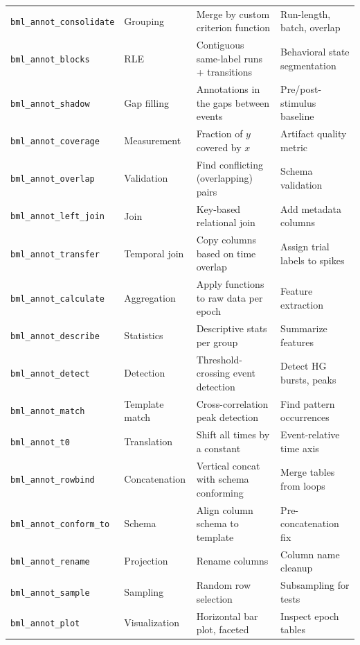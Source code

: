 \documentclass[11pt, a4paper]{article}
\begin{document}
\begin{center}
\begin{longtable}{L{3.5cm} L{2.5cm} L{3.5cm} L{4cm}}
\texttt{bml\_annot\_consolidate} & Grouping & Merge by custom criterion function & Run-length, batch, overlap \\
\texttt{bml\_annot\_blocks} & RLE & Contiguous same-label runs + transitions & Behavioral state segmentation \\
\texttt{bml\_annot\_shadow} & Gap filling & Annotations in the gaps between events & Pre/post-stimulus baseline \\
\texttt{bml\_annot\_coverage} & Measurement & Fraction of $y$ covered by $x$ & Artifact quality metric \\
\texttt{bml\_annot\_overlap} & Validation & Find conflicting (overlapping) pairs & Schema validation \\
\texttt{bml\_annot\_left\_join} & Join & Key-based relational join & Add metadata columns \\
\texttt{bml\_annot\_transfer} & Temporal join & Copy columns based on time overlap & Assign trial labels to spikes \\
\texttt{bml\_annot\_calculate} & Aggregation & Apply functions to raw data per epoch & Feature extraction \\
\texttt{bml\_annot\_describe} & Statistics & Descriptive stats per group & Summarize features \\
\texttt{bml\_annot\_detect} & Detection & Threshold-crossing event detection & Detect HG bursts, peaks \\
\texttt{bml\_annot\_match} & Template match & Cross-correlation peak detection & Find pattern occurrences \\
\texttt{bml\_annot\_t0} & Translation & Shift all times by a constant & Event-relative time axis \\
\texttt{bml\_annot\_rowbind} & Concatenation & Vertical concat with schema conforming & Merge tables from loops \\
\texttt{bml\_annot\_conform\_to} & Schema & Align column schema to template & Pre-concatenation fix \\
\texttt{bml\_annot\_rename} & Projection & Rename columns & Column name cleanup \\
\texttt{bml\_annot\_sample} & Sampling & Random row selection & Subsampling for tests \\
\texttt{bml\_annot\_plot} & Visualization & Horizontal bar plot, faceted & Inspect epoch tables \\
\bottomrule
\end{longtable}
\end{center}
\end{document}
